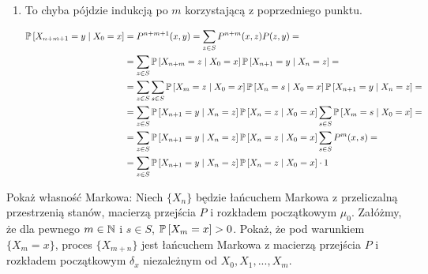 \begin{solution}
\begin{enumerate}
%

    \item To chyba pójdzie indukcją po $m$ korzystającą z poprzedniego punktu.

      \begin{align*}
        \prob{X_{n+m+1}=y}{X_0=x}&=P^{n+m+1}(x, y)=\sum_{z\in S}P^{n+m}(x, z)P(z, y)=\\ 
                                 &=\sum_{z\in S}\prob{X_{n+m}=z}{X_0=x}\prob{X_{n+1}=y}{X_n=z}=\\ 
                                 &=\sum_{z\in S}\sum_{s\in S}\prob{X_m=z}{X_0=x}\prob{X_n=s}{X_0=x}\prob{X_{n+1}=y}{X_n=z}=\\ 
                                 &=\sum_{z\in S}\prob{X_{n+1}=y}{X_n=z}\prob{X_n=z}{X_0=x}\sum_{s\in S}\prob{X_m=s}{X_0=x}=\\ 
                                 &=\sum_{z\in S}\prob{X_{n+1}=y}{X_n=z}\prob{X_n=z}{X_0=x}\sum_{s\in S}P^m(x, s)=\\ 
                                 &=\sum_{z\in S}\prob{X_{n+1}=y}{X_n=z}\prob{X_n=z}{X_0=x}\cdot 1
      \end{align*}
  \end{enumerate}
\end{solution}

\begin{problem}
  Pokaż własność Markowa: Niech $\{X_n\}$ będzie łańcuchem Markowa z przeliczalną przestrzenią stanów, macierzą przejścia $P$ i rozkładem początkowym $\mu_0$. Załóżmy, że dla pewnego $m\in\operatorname{\mathbb{N}}$ i $s\in S$, $\prob{X_m=x}>0$. Pokaż, że pod warunkiem $\{X_m=x\}$, proces $\{X_{m+n}\}$ jest łańcuchem Markowa z macierzą przejścia $P$ i rozkładem początkowym $\delta_x$ niezależnym od $X_0,X_1,..., X_m$.
\end{problem}

